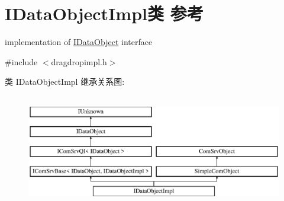 \hypertarget{class_i_data_object_impl}{}\section{I\+Data\+Object\+Impl类 参考}
\label{class_i_data_object_impl}


implementation of \hyperlink{interface_i_data_object}{I\+Data\+Object} interface  




{\ttfamily \#include $<$dragdropimpl.\+h$>$}

类 I\+Data\+Object\+Impl 继承关系图\+:\begin{figure}[H]
\begin{center}
\leavevmode
\includegraphics[height=4.946997cm]{class_i_data_object_impl}
\end{center}
\end{figure}
